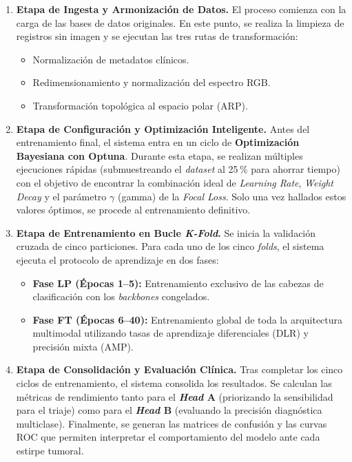 \begin{enumerate}
	\item \textbf{Etapa de Ingesta y Armonización de Datos.} El proceso comienza con la carga de las bases de datos originales. En este punto, se realiza la limpieza de registros sin imagen y se ejecutan las tres rutas de transformación:
	\begin{itemize}
		\item Normalización de metadatos clínicos.
		\item Redimensionamiento y normalización del espectro RGB.
		\item Transformación topológica al espacio polar (ARP).
	\end{itemize}
	
	\item \textbf{Etapa de Configuración y Optimización Inteligente.} Antes del entrenamiento final, el sistema entra en un ciclo de \textbf{Optimización Bayesiana con Optuna}. Durante esta etapa, se realizan múltiples ejecuciones rápidas (submuestreando el \textit{dataset} al 25\,\% para ahorrar tiempo) con el objetivo de encontrar la combinación ideal de \textit{Learning Rate}, \textit{Weight Decay} y el parámetro $\gamma$ (gamma) de la \textit{Focal Loss}. Solo una vez hallados estos valores óptimos, se procede al entrenamiento definitivo.
	
	\item \textbf{Etapa de Entrenamiento en Bucle \textit{K-Fold}.} Se inicia la validación cruzada de cinco particiones. Para cada uno de los cinco \textit{folds}, el sistema ejecuta el protocolo de aprendizaje en dos fases:
	\begin{itemize}
		\item \textbf{Fase LP (Épocas 1--5):} Entrenamiento exclusivo de las cabezas de clasificación con los \textit{backbones} congelados.
		\item \textbf{Fase FT (Épocas 6--40):} Entrenamiento global de toda la arquitectura multimodal utilizando tasas de aprendizaje diferenciales (DLR) y precisión mixta (AMP).
	\end{itemize}
	
	\item \textbf{Etapa de Consolidación y Evaluación Clínica.} Tras completar los cinco ciclos de entrenamiento, el sistema consolida los resultados. Se calculan las métricas de rendimiento tanto para el \textbf{\textit{Head} A} (priorizando la sensibilidad para el triaje) como para el \textbf{\textit{Head} B} (evaluando la precisión diagnóstica multiclase). Finalmente, se generan las matrices de confusión y las curvas ROC que permiten interpretar el comportamiento del modelo ante cada estirpe tumoral.
\end{enumerate}


